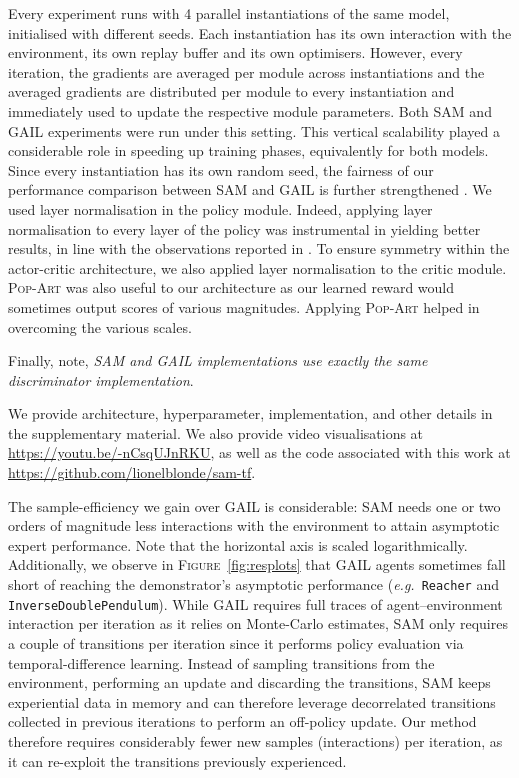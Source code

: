 Every experiment runs with 4 parallel instantiations of the same model,
initialised with different seeds.
Each instantiation has its own interaction with the environment,
its own replay buffer and its own optimisers.
However, every iteration, the gradients are averaged per module
across instantiations and the
averaged gradients are distributed per module
to every instantiation and immediately used to update the respective module
parameters.
Both SAM and GAIL experiments were run under this setting.
This vertical scalability played a considerable role
in speeding up training phases, equivalently for both models.
Since every instantiation has its own random seed, the fairness of our
performance comparison between SAM and GAIL is further
strengthened \cite{Duan2016-lg,Henderson2018-vm}.
We used layer normalisation \cite{Ba2016-bs} in the policy module.
Indeed, applying layer normalisation to every layer of the policy
was instrumental in yielding better results,
in line with the observations reported in \cite{Plappert2018-rl}.
To ensure symmetry within the actor-critic architecture, we also applied
layer normalisation to the critic module.
\textsc{Pop-Art} \cite{Van_Hasselt2016-bh}
was also useful to our architecture as our learned reward
would sometimes output scores of various magnitudes.
Applying \textsc{Pop-Art} helped in overcoming the various scales.

Finally, note, \emph{SAM and GAIL implementations use exactly the same
discriminator implementation}.

We provide architecture, hyperparameter, implementation,
and other details in the supplementary material.
We also provide video visualisations at
\url{https://youtu.be/-nCsqUJnRKU},
as well as the code associated with this work at
\url{https://github.com/lionelblonde/sam-tf}.

The sample-efficiency we gain over GAIL is considerable:
SAM needs one or two orders of magnitude less interactions with the
environment
to attain asymptotic expert performance.
Note that the horizontal axis is scaled logarithmically.
Additionally, we observe in \textsc{Figure}~\ref{fig:resplots} that
GAIL agents sometimes fall short of reaching the demonstrator's
asymptotic performance (\textit{e.g.}~\texttt{Reacher} and \texttt{InverseDoublePendulum}).
While GAIL requires full traces of agent--environment interaction
per iteration as it relies on Monte-Carlo estimates,
SAM
only requires a couple of transitions per iteration since it performs
policy evaluation via temporal-difference learning.
Instead of sampling transitions from the environment, performing an update and
discarding the transitions,
SAM keeps experiential data in memory and can therefore leverage
decorrelated
transitions collected in previous iterations to perform an off-policy update.
Our method therefore requires considerably fewer new samples (interactions)
per iteration, as
it can re-exploit the transitions previously experienced.

